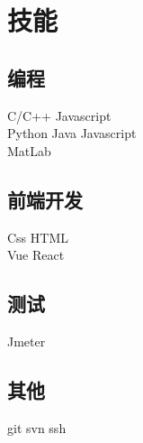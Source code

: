 \documentclass[]{deedy-resume-openfont}
\begin{document}
\begin{minipage}[t]{0.3\textwidth}

\section{技能}
\sectionsep
\subsection{编程}
C/C++ \textbullet{} Javascript \\
Python \textbullet{} Java \textbullet{} Javascript \\
MatLab \textbullet{} \\ 
\sectionsep

\subsection{前端开发}
Css \textbullet{} HTML \textbullet{} \\
Vue \textbullet{} React \textbullet{}\\
\sectionsep

\subsection{测试}
Jmeter  \\
\sectionsep

\subsection{其他}
git \textbullet svn \textbullet ssh \\

%
%

\end{minipage} 
\hfill
\end{document}

